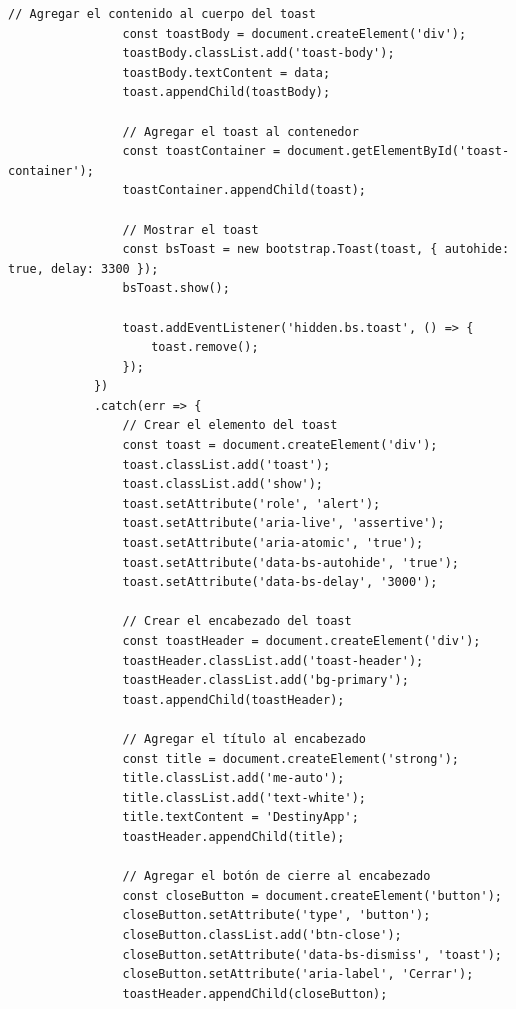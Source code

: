 \documentclass{article}
\begin{document}
\begin{lstlisting}[caption={script delete}, label={codigo-scripts}]
                // Agregar el contenido al cuerpo del toast
                const toastBody = document.createElement('div');
                toastBody.classList.add('toast-body');
                toastBody.textContent = data;
                toast.appendChild(toastBody);
        
                // Agregar el toast al contenedor
                const toastContainer = document.getElementById('toast-container');
                toastContainer.appendChild(toast);
        
                // Mostrar el toast
                const bsToast = new bootstrap.Toast(toast, { autohide: true, delay: 3300 });
                bsToast.show();
        
                toast.addEventListener('hidden.bs.toast', () => {
                    toast.remove();
                });
            })
            .catch(err => {
                // Crear el elemento del toast
                const toast = document.createElement('div');
                toast.classList.add('toast');
                toast.classList.add('show');
                toast.setAttribute('role', 'alert');
                toast.setAttribute('aria-live', 'assertive');
                toast.setAttribute('aria-atomic', 'true');
                toast.setAttribute('data-bs-autohide', 'true');
                toast.setAttribute('data-bs-delay', '3000');
        
                // Crear el encabezado del toast
                const toastHeader = document.createElement('div');
                toastHeader.classList.add('toast-header');
                toastHeader.classList.add('bg-primary');
                toast.appendChild(toastHeader);
        
                // Agregar el título al encabezado
                const title = document.createElement('strong');
                title.classList.add('me-auto');
                title.classList.add('text-white');
                title.textContent = 'DestinyApp';
                toastHeader.appendChild(title);
        
                // Agregar el botón de cierre al encabezado
                const closeButton = document.createElement('button');
                closeButton.setAttribute('type', 'button');
                closeButton.classList.add('btn-close');
                closeButton.setAttribute('data-bs-dismiss', 'toast');
                closeButton.setAttribute('aria-label', 'Cerrar');
                toastHeader.appendChild(closeButton);
        

\end{lstlisting}
\end{document}
